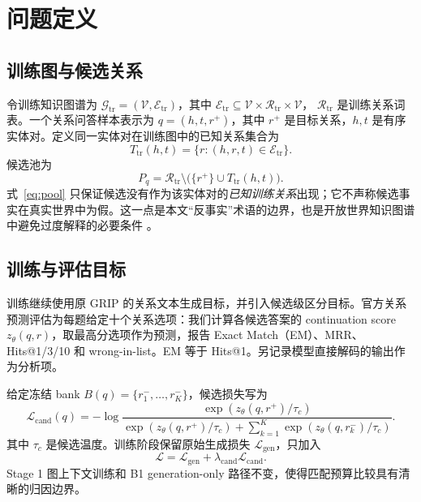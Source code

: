 \section{问题定义}

\subsection{训练图与候选关系}

令训练知识图谱为 $\mathcal{G}_{\mathrm{tr}}=(\mathcal{V},\mathcal{E}_{\mathrm{tr}})$，其中
$\mathcal{E}_{\mathrm{tr}}\subseteq \mathcal{V}\times\mathcal{R}_{\mathrm{tr}}\times\mathcal{V}$，
$\mathcal{R}_{\mathrm{tr}}$ 是训练关系词表。一个关系问答样本表示为
$q=(h,t,r^+)$，其中 $r^+$ 是目标关系，$h,t$ 是有序实体对。定义同一实体对在训练图中的已知关系集合为
\begin{equation}
    T_{\mathrm{tr}}(h,t)=\{r:(h,r,t)\in\mathcal{E}_{\mathrm{tr}}\}.
\end{equation}
候选池为
\begin{equation}
    P_q=\mathcal{R}_{\mathrm{tr}}\setminus\bigl(\{r^+\}\cup T_{\mathrm{tr}}(h,t)\bigr).
    \label{eq:pool}
\end{equation}
式~\ref{eq:pool} 只保证候选没有作为该实体对的\emph{已知训练关系}出现；它不声称候选事实在真实世界中为假。这一点是本文“反事实”术语的边界，也是开放世界知识图谱中避免过度解释的必要条件 \citep{ji2022survey,hogan2021kg}。

\subsection{训练与评估目标}

训练继续使用原 GRIP 的关系文本生成目标，并引入候选级区分目标。官方关系预测评估为每题给定十个关系选项：我们计算各候选答案的 continuation score $z_\theta(q,r)$，取最高分选项作为预测，报告 Exact Match（EM）、MRR、Hits@1/3/10 和 wrong-in-list。EM 等于 Hits@1。另记录模型直接解码的输出作为分析项。

给定冻结 bank $B(q)=\{r_1^-,\ldots,r_K^-\}$，候选损失写为
\begin{equation}
    \mathcal{L}_{\mathrm{cand}}(q)=-\log
    \frac{\exp(z_\theta(q,r^+)/\tau_c)}
    {\exp(z_\theta(q,r^+)/\tau_c)+\sum_{k=1}^K\exp(z_\theta(q,r_k^-)/\tau_c)}.
    \label{eq:infonce}
\end{equation}
其中 $\tau_c$ 是候选温度。训练阶段保留原始生成损失 $\mathcal{L}_{\mathrm{gen}}$，只加入
\begin{equation}
    \mathcal{L}=\mathcal{L}_{\mathrm{gen}}+\lambda_{\mathrm{cand}}\mathcal{L}_{\mathrm{cand}}.
    \label{eq:total}
\end{equation}
Stage 1 图上下文训练和 B1 generation-only 路径不变，使得匹配预算比较具有清晰的归因边界。
